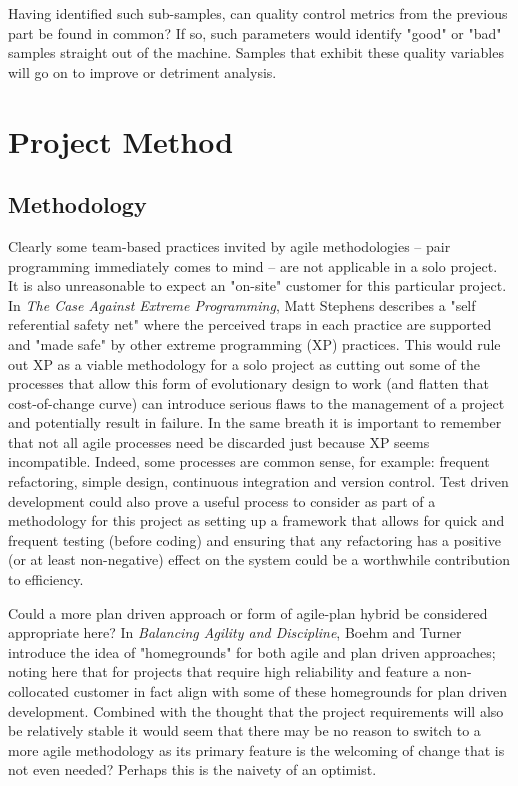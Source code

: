 Having identified such sub-samples, can quality control metrics from the
previous part be found in common? If so, such parameters would identify "good"
or "bad" samples straight out of the machine. Samples that exhibit these quality
variables will go on to improve or detriment analysis.


\section{Project Method}
\subsection{Methodology}
\label{chap:methodology}

Clearly some team-based practices invited by agile methodologies -- pair
programming immediately comes to mind -- are not applicable in a solo project.
It is also unreasonable to expect an "on-site" customer for this particular
project. In \textit{The Case Against Extreme Programming}\citep{case-xp}, Matt Stephens
describes a "self referential safety net" where the perceived traps in each
practice are supported and "made safe" by other extreme programming (XP)
practices.  This would rule out XP as a viable methodology for a
solo project as cutting out some of the processes that allow this form of
evolutionary design to work (and flatten that cost-of-change curve) can
introduce serious flaws to the management of a project and potentially result in
failure. In the same breath it is important to remember that not all agile
processes need be discarded just because XP seems incompatible. Indeed, some
processes are common sense, for example: frequent refactoring, simple
design, continuous integration and version control. Test driven development
could also prove a useful process to consider as part of a methodology for this
project as setting up a framework that allows for quick and frequent testing
(before coding) and ensuring that any refactoring has a positive (or at least
non-negative) effect on the system could be a worthwhile contribution to
efficiency.

Could a more plan driven approach or form of agile-plan hybrid be considered
appropriate here? In \textit{Balancing Agility and Discipline}\citep{balance-agile}, Boehm
and Turner introduce the idea of "homegrounds" for both agile and plan driven
approaches; noting here that for projects that require high reliability and
feature a non-collocated customer in fact align with some of these
homegrounds for plan driven development. Combined with the thought that the
project requirements will also be relatively stable it would seem that there
may be no reason to switch to a more agile methodology as its primary feature
is the welcoming of change that is not even needed? Perhaps this is the naivety
of an optimist.

